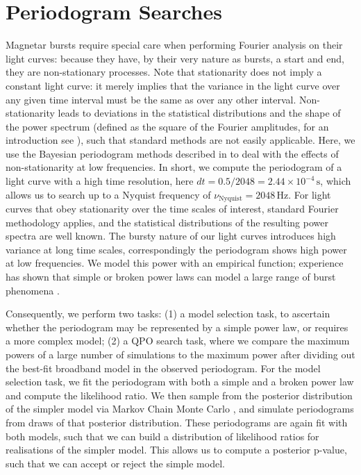 \documentclass[numberedappendix]{emulateapj}
\begin{document}
\section{Periodogram Searches}
\label{sec:analysis}

Magnetar bursts require special care when performing Fourier analysis on their light curves: because they have, by their very nature as bursts, a start and end, they are non-stationary processes. Note that stationarity does not imply a constant light curve: it merely implies that the variance in the light curve over any given time interval must be the same as over any other interval. Non-stationarity leads to deviations in the statistical distributions and the shape of the power spectrum (defined as the square of the Fourier amplitudes, for an introduction see \citealp{vanderklis1989}), such that standard methods are not easily applicable.
Here, we use the Bayesian periodogram methods described in \citet{huppenkothen2013} to deal with the effects of non-stationarity at low frequencies. In short, we compute the periodogram of a light curve with a high time resolution, here $dt = 0.5/2048 = 2.44 \times 10^{-4} \, \mathrm{s}$, which allows us to search up to a Nyquist frequency of $\nu_{\mathrm{Nyquist}} = 2048 \, \mathrm{Hz}$. For light curves that obey stationarity over the time scales of interest, standard Fourier methodology applies, and the statistical distributions of the resulting power spectra are well known. The bursty nature of our light curves introduces high variance at long time scales, correspondingly the periodogram shows high power at low frequencies. We model this power with an empirical function; experience has shown that simple or broken power laws can model a large range of burst phenomena \citep{huppenkothen2013}. 

Consequently, we perform two tasks: (1) a model selection task, to ascertain whether the periodogram may be represented by a simple power law, or requires a more complex model; (2) a QPO search task, where we compare the maximum powers of a large number of simulations to the maximum power after dividing out the best-fit broadband model in the observed periodogram. For the model selection task, we fit the periodogram with both a simple and a broken power law and compute the likelihood ratio. We then sample from the posterior distribution of the simpler model via Markov Chain Monte Carlo \citep[using the freely available {\it python} code {\it emcee},][]{foreman2013}, and simulate periodograms from draws of that posterior distribution. These periodograms are again fit with both models, such that we can build a distribution of likelihood ratios for realisations of the simpler model. This allows us to compute a posterior p-value, such that we can accept or reject the simple model. %
\end{document}
